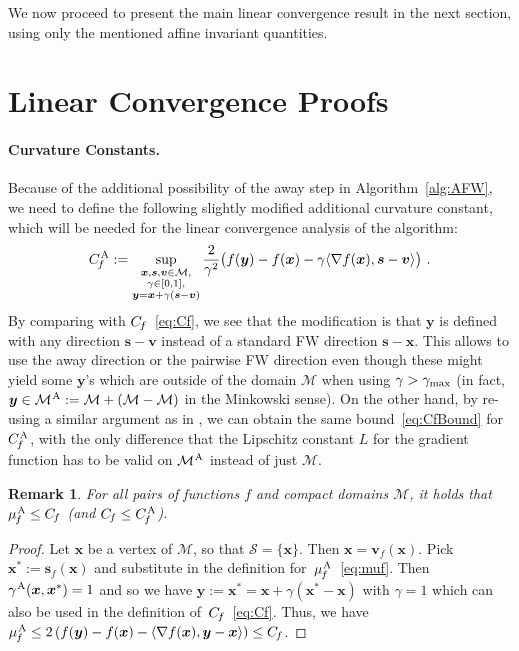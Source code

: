 \documentclass{article} %
\newtheorem{remark}[definition]{Remark}
\newcommand{\domain}{\mathcal{M}} %
\newcommand{\stepsize}{\gamma}
\newcommand{\stepmax}{\stepsize_{\textnormal{\scriptsize max}}} %
\newcommand{\away}{{\hspace{0.06em}\textnormal{\scriptsize A}}}
\newcommand{\Cf}{C_{\hspace{-0.08em}f}}
\newcommand{\CfAFW}{C_{\hspace{-0.08em}f}^\away}
\newcommand{\strongConvAFW}{\mu_{\hspace{-0.08em}f}^\away}
\newcommand{\x}{\bm{x}}
\newcommand{\y}{\bm{y}}
\newcommand{\s}{\bm{s}}
\newcommand{\vv}{\bm{v}} %
\renewcommand{\S}{\mathcal{S}}
\newcommand{\0}{\mathbf{0}} %
\begin{document}
We now proceed to present the main linear convergence result in the next section, using only the mentioned affine invariant quantities.


%
\section{Linear Convergence Proofs}\label{sec:conv}

\paragraph{Curvature Constants.}
Because of the additional possibility of the away step in
Algorithm~\ref{alg:AFW}, we need to define the following slightly modified
additional curvature constant, which will be needed for the linear
convergence analysis of the algorithm:
\begin{equation}\label{eq:CfAFW}
  \CfAFW := \sup_{\substack{\x,\s,\vv\in \domain, \\
                      \stepsize\in[0,1],\\
                      \y = \x+\stepsize(\s-\vv)}}
           \frac{2}{\stepsize^2}\big( f(\y)-f(\x)-\stepsize \langle \nabla f(\x), \s-\vv
\rangle \big) \ .
\end{equation}
By comparing with $\Cf$~\eqref{eq:Cf}, we see that the modification is that
$\y$ is defined with any direction $\s -\vv$ instead of a standard
FW direction $\s - \x$. This allows to use the away direction or the pairwise FW direction even though these might yield some $\y$'s which are outside of the
domain $\domain$ when using $\stepsize > \stepmax$ (in fact, $\y \in \domain^\away := \domain + (\domain -
\domain)$ in the Minkowski sense). On the other hand, by re-using a similar
argument as in \citep[Lemma 7]{Jaggi:2013wg}, we can obtain the same
bound~\eqref{eq:CfBound} for $\CfAFW$, with the only difference that the
Lipschitz constant $L$ for the gradient function has to be valid on
$\domain^\away$ instead of just $\domain$.

%
\begin{remark}\label{rem:mfAFWsmallerThanCf}
For all pairs of functions $f$ and compact domains $\domain$, it holds that $\strongConvAFW \le \Cf$ (and $\Cf \le \CfAFW$).
\end{remark}\vspace{-2mm}
\begin{proof}
Let $\x$ be a vertex of $\domain$, so that $\S = \{\x\}$. Then $\x = \vv_f(\x)$. Pick $\x^* := \s_f(\x)$ and substitute in the definition for~$\strongConvAFW$~\eqref{eq:muf}. Then $\stepsize^\away(\x,\x^*) = 1$ and so we have $\y := \x^* = \x + \stepsize (\x^*-\x)$ with $\stepsize = 1$ which can also be used in the definition of~$\Cf$~\eqref{eq:Cf}. Thus, we have $\strongConvAFW \leq 2\left( f(\y)-f(\x) - \langle \nabla f(\x), \y-\x \rangle \right) \leq \Cf$.
\end{proof}
\end{document}
